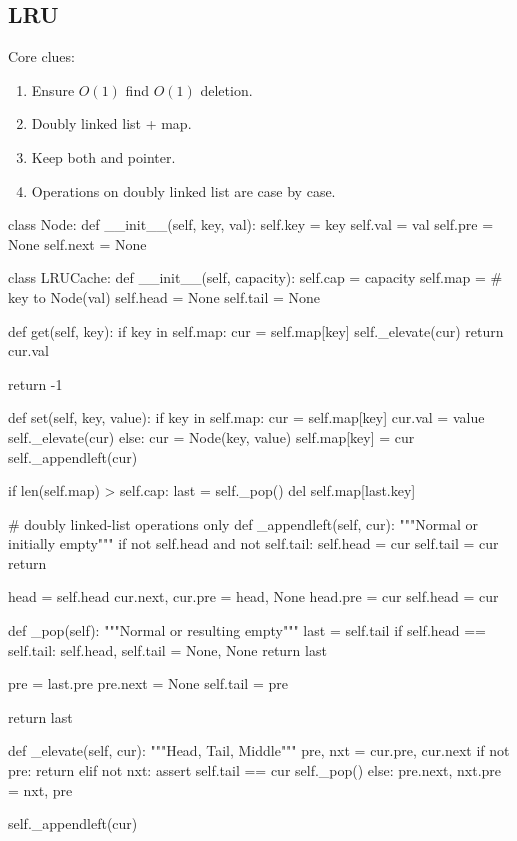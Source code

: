 \subsection{LRU}
Core clues:
\begin{enumerate}
\item Ensure $O(1)$ find $O(1)$ deletion. 
\item Doubly linked list + map.
\item Keep both  and  pointer.
\item Operations on doubly linked list are case by case.  
\end{enumerate}
\begin{python}
class Node:
    def __init__(self, key, val):
        self.key = key
        self.val = val
        self.pre = None 
        self.next = None


class LRUCache:
    def __init__(self, capacity):
        self.cap = capacity
        self.map = {}  # key to Node(val)
        self.head = None
        self.tail = None

    def get(self, key):
        if key in self.map:
            cur = self.map[key]
            self._elevate(cur)
            return cur.val

        return -1

    def set(self, key, value):
        if key in self.map:
            cur = self.map[key]
            cur.val = value
            self._elevate(cur)
        else:
            cur = Node(key, value)
            self.map[key] = cur
            self._appendleft(cur)

            if len(self.map) > self.cap:
                last = self._pop()
                del self.map[last.key]

    # doubly linked-list operations only
    def _appendleft(self, cur):
        """Normal or initially empty"""
        if not self.head and not self.tail:
            self.head = cur
            self.tail = cur
            return

        head = self.head
        cur.next, cur.pre = head, None
        head.pre = cur
        self.head = cur

    def _pop(self):
        """Normal or resulting empty"""
        last = self.tail
        if self.head == self.tail:
            self.head, self.tail = None, None
            return last

        pre = last.pre
        pre.next = None
        self.tail = pre
        
        return last

    def _elevate(self, cur):
        """Head, Tail, Middle"""
        pre, nxt = cur.pre, cur.next
        if not pre:
            return
        elif not nxt:
            assert self.tail == cur
            self._pop()
        else:
            pre.next, nxt.pre = nxt, pre

        self._appendleft(cur)
\end{python}

